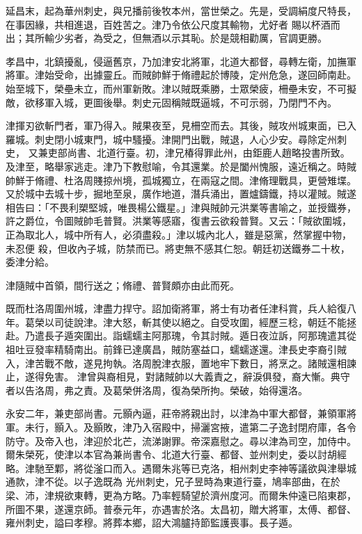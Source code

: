 \begin{pinyinscope}
 延昌末，起為華州刺史，與兄播前後牧本州，當世榮之。先是，受調絹度尺特長，在事因緣，共相進退，百姓苦之。津乃令依公尺度其輸物，尤好者
 賜以杯酒而出；其所輸少劣者，為受之，但無酒以示其恥。於是競相勸厲，官調更勝。



 孝昌中，北鎮擾亂，侵逼舊京，乃加津安北將軍，北道大都督，尋轉左衛，加撫軍將軍。津始受命，出據靈丘。而賊帥鮮于脩禮起於博陵，定州危急，遂回師南赴。始至城下，榮壘未立，而州軍新敗。津以賊既乘勝，士眾榮疲，柵壘未安，不可擬敵，欲移軍入城，更圖後舉。刺史元固稱賊既逼城，不可示弱，乃閉門不內。



 津揮刃欲斬門者，軍乃得入。賊果夜至，見柵空而去。其後，賊攻州城東面，已入羅城。刺史閉小城東門，城中騷擾。津開門出戰，賊退，人心少安。尋除定州刺史，
 又兼吏部尚書、北道行臺。初，津兄椿得罪此州，由鉅鹿人趙略投書所致。及津至，略舉家逃走。津乃下教慰喻，令其還業。於是闔州愧服，遠近稱之。時賊帥鮮于脩禮、杜洛周賤掠州境，孤城獨立，在兩寇之間。津脩理戰具，更營雉堞。又於城中去城十步，掘地至泉，廣作地道，潛兵涌出，置爐鑄鐵，持以灌賊。賊遂相告曰：「不畏利槊堅城，唯畏楊公鐵星。」津與賊帥元洪業等書喻之，並授鐵券，許之爵位，令圖賊帥毛普賢。洪業等感寤，復書云欲殺普賢。又云：「賊欲圍城，正為取北人，城中所有人，必須盡殺。」津以城內北人，雖是惡黨，然掌握中物，未忍便
 殺，但收內子城，防禁而已。將吏無不感其仁恕。朝廷初送鐵券二十枚，委津分給。



 津隨賊中首領，間行送之；脩禮、普賢頗亦由此而死。



 既而杜洛周圍州城，津盡力捍守。詔加衛將軍，將士有功者任津科賞，兵人給復八年。葛榮以司徒說津。津大怒，斬其使以絕之。自受攻圍，經歷三稔，朝廷不能拯赴。乃遣長子遁突圍出。詣蠕蠕主阿那瑰，令其討賊。遁日夜泣訴，阿那瑰遣其從祖吐豆發率精騎南出。前鋒已達廣昌，賊防塞益口，蠕蠕遂還。津長史李裔引賊入，津苦戰不敵，遂見拘執。洛周脫津衣服，置地牢下數日，將烹之。諸賊還相諫止，遂得免害。
 津曾與裔相見，對諸賊帥以大義責之，辭淚俱發，裔大慚。典守者以告洛周，弗之責。及葛榮併洛周，復為榮所拘。榮破，始得還洛。



 永安二年，兼吏部尚書。元顥內逼，莊帝將親出討，以津為中軍大都督，兼領軍將軍。未行，顥入。及顥敗，津乃入宿殿中，掃灑宮掖，遣第二子逸封閉府庫，各令防守。及帝入也，津迎於北芒，流涕謝罪。帝深嘉慰之。尋以津為司空，加侍中。爾朱榮死，使津以本官為兼尚書令、北道大行臺、都督、並州刺史，委以討胡經略。津馳至鄴，將從滏口而入。遇爾朱兆等已克洛，相州刺史李神等議欲與津舉城通款，津不從。以子逸既為
 光州刺史，兄子昱時為東道行臺，鳩率部曲，在於梁、沛，津規欲東轉，更為方略。乃率輕騎望於濟州度河。而爾朱仲遠已陷東郡，所圖不果，遂還京師。普泰元年，亦遇害於洛。太昌初，贈大將軍，太傅、都督、雍州刺史，謚曰孝穆。將葬本鄉，詔大鴻臚持節監護喪事。長子遁。




\end{pinyinscope}
